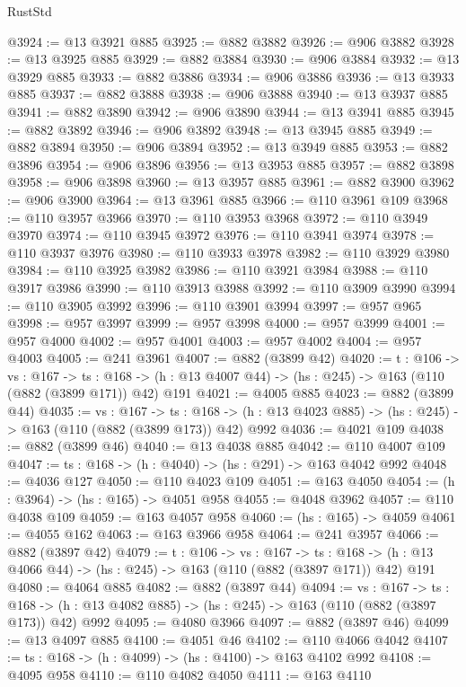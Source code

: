 \begin{lexlean}{RustStd}
\begin{coremodule}
@3924 := @13 @3921 @885
@3925 := @882 @3882
@3926 := @906 @3882
@3928 := @13 @3925 @885
@3929 := @882 @3884
@3930 := @906 @3884
@3932 := @13 @3929 @885
@3933 := @882 @3886
@3934 := @906 @3886
@3936 := @13 @3933 @885
@3937 := @882 @3888
@3938 := @906 @3888
@3940 := @13 @3937 @885
@3941 := @882 @3890
@3942 := @906 @3890
@3944 := @13 @3941 @885
@3945 := @882 @3892
@3946 := @906 @3892
@3948 := @13 @3945 @885
@3949 := @882 @3894
@3950 := @906 @3894
@3952 := @13 @3949 @885
@3953 := @882 @3896
@3954 := @906 @3896
@3956 := @13 @3953 @885
@3957 := @882 @3898
@3958 := @906 @3898
@3960 := @13 @3957 @885
@3961 := @882 @3900
@3962 := @906 @3900
@3964 := @13 @3961 @885
@3966 := @110 @3961 @109
@3968 := @110 @3957 @3966
@3970 := @110 @3953 @3968
@3972 := @110 @3949 @3970
@3974 := @110 @3945 @3972
@3976 := @110 @3941 @3974
@3978 := @110 @3937 @3976
@3980 := @110 @3933 @3978
@3982 := @110 @3929 @3980
@3984 := @110 @3925 @3982
@3986 := @110 @3921 @3984
@3988 := @110 @3917 @3986
@3990 := @110 @3913 @3988
@3992 := @110 @3909 @3990
@3994 := @110 @3905 @3992
@3996 := @110 @3901 @3994
@3997 := @957 @965
@3998 := @957 @3997
@3999 := @957 @3998
@4000 := @957 @3999
@4001 := @957 @4000
@4002 := @957 @4001
@4003 := @957 @4002
@4004 := @957 @4003
@4005 := @241 @3961
@4007 := @882 (@3899 @42)
@4020 := {t : @106} ->
  {vs : @167} ->
  {ts : @168} -> (h : @13 @4007 @44) -> (hs : @245) -> @163 (@110 (@882 (@3899 @171)) @42) @191
@4021 := @4005 @885
@4023 := @882 (@3899 @44)
@4035 := {vs : @167} ->
  {ts : @168} -> (h : @13 @4023 @885) -> (hs : @245) -> @163 (@110 (@882 (@3899 @173)) @42) @992
@4036 := @4021 @109
@4038 := @882 (@3899 @46)
@4040 := @13 @4038 @885
@4042 := @110 @4007 @109
@4047 := {ts : @168} -> (h : @4040) -> (hs : @291) -> @163 @4042 @992
@4048 := @4036 @127
@4050 := @110 @4023 @109
@4051 := @163 @4050
@4054 := (h : @3964) -> (hs : @165) -> @4051 @958
@4055 := @4048 @3962
@4057 := @110 @4038 @109
@4059 := @163 @4057 @958
@4060 := (hs : @165) -> @4059
@4061 := @4055 @162
@4063 := @163 @3966 @958
@4064 := @241 @3957
@4066 := @882 (@3897 @42)
@4079 := {t : @106} ->
  {vs : @167} ->
  {ts : @168} -> (h : @13 @4066 @44) -> (hs : @245) -> @163 (@110 (@882 (@3897 @171)) @42) @191
@4080 := @4064 @885
@4082 := @882 (@3897 @44)
@4094 := {vs : @167} ->
  {ts : @168} -> (h : @13 @4082 @885) -> (hs : @245) -> @163 (@110 (@882 (@3897 @173)) @42) @992
@4095 := @4080 @3966
@4097 := @882 (@3897 @46)
@4099 := @13 @4097 @885
@4100 := @4051 @46
@4102 := @110 @4066 @4042
@4107 := {ts : @168} -> (h : @4099) -> (hs : @4100) -> @163 @4102 @992
@4108 := @4095 @958
@4110 := @110 @4082 @4050
@4111 := @163 @4110

\end{coremodule}
\end{lexlean}
